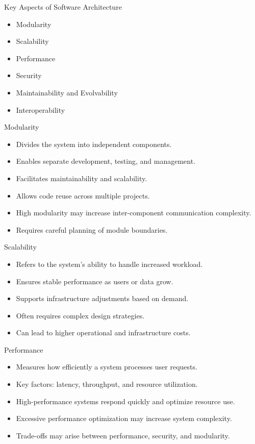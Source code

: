 \documentclass[aspectratio=169, table]{beamer}
\begin{document}
	\begin{frame}{Key Aspects of Software Architecture}
		\begin{itemize}
			\item Modularity
			\item Scalability
			\item Performance
			\item Security
			\item Maintainability and Evolvability
			\item Interoperability
		\end{itemize}
	\end{frame}
	
	\begin{frame}{Modularity}
		\begin{itemize}
			\item Divides the system into independent components.
			\item Enables separate development, testing, and management.
			\item Facilitates maintainability and scalability.
			\item Allows code reuse across multiple projects.
			\item High modularity may increase inter-component communication complexity.
			\item Requires careful planning of module boundaries.
		\end{itemize}
	\end{frame}
	
	\begin{frame}{Scalability}
		\begin{itemize}
			\item Refers to the system's ability to handle increased workload.
			\item Ensures stable performance as users or data grow.
			\item Supports infrastructure adjustments based on demand.
			\item Often requires complex design strategies.
			\item Can lead to higher operational and infrastructure costs.
		\end{itemize}
	\end{frame}
	
	\begin{frame}{Performance}
		\begin{itemize}
			\item Measures how efficiently a system processes user requests.
			\item Key factors: latency, throughput, and resource utilization.
			\item High-performance systems respond quickly and optimize resource use.
			\item Excessive performance optimization may increase system complexity.
			\item Trade-offs may arise between performance, security, and modularity.
		\end{itemize}
	\end{frame}
	
\end{document}
